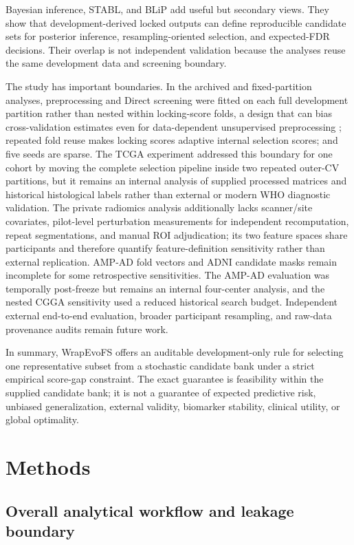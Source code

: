 Bayesian inference, STABL, and BLiP add useful but secondary views. They show that development-derived locked outputs can define reproducible candidate sets for posterior inference, resampling-oriented selection, and expected-FDR decisions. Their overlap is not independent validation because the analyses reuse the same development data and screening boundary.

The study has important boundaries. In the archived and fixed-partition analyses, preprocessing and Direct screening were fitted on each full development partition rather than nested within locking-score folds, a design that can bias cross-validation estimates even for data-dependent unsupervised preprocessing \citep{ref39}; repeated fold reuse makes locking scores adaptive internal selection scores; and five seeds are sparse. The TCGA experiment addressed this boundary for one cohort by moving the complete selection pipeline inside two repeated outer-CV partitions, but it remains an internal analysis of supplied processed matrices and historical histological labels rather than external or modern WHO diagnostic validation. The private radiomics analysis additionally lacks scanner/site covariates, pilot-level perturbation measurements for independent recomputation, repeat segmentations, and manual ROI adjudication; its two feature spaces share participants and therefore quantify feature-definition sensitivity rather than external replication. AMP-AD fold vectors and ADNI candidate masks remain incomplete for some retrospective sensitivities. The AMP-AD evaluation was temporally post-freeze but remains an internal four-center analysis, and the nested CGGA sensitivity used a reduced historical search budget. Independent external end-to-end evaluation, broader participant resampling, and raw-data provenance audits remain future work.

In summary, WrapEvoFS offers an auditable development-only rule for selecting one representative subset from a stochastic candidate bank under a strict empirical score-gap constraint. The exact guarantee is feasibility within the supplied candidate bank; it is not a guarantee of expected predictive risk, unbiased generalization, external validity, biomarker stability, clinical utility, or global optimality.

\FloatBarrier
\section{Methods}

\subsection{Overall analytical workflow and leakage boundary}

